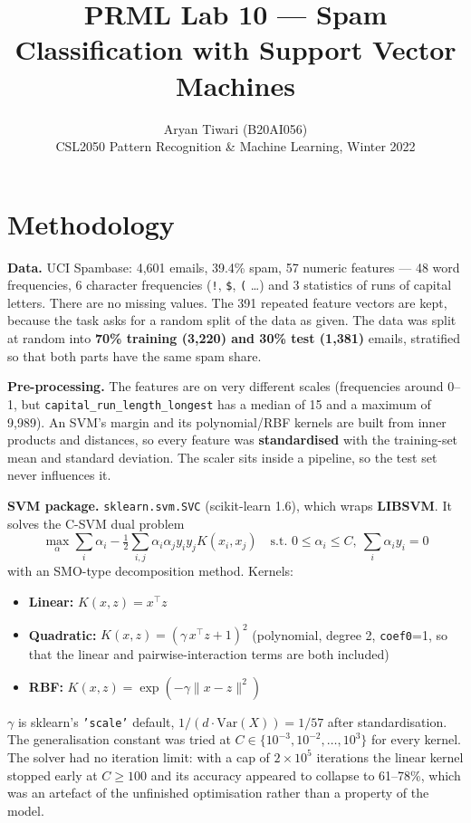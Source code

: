 \documentclass[11pt]{article}
\title{\textbf{PRML Lab 10 --- Spam Classification with Support Vector Machines}}
\author{Aryan Tiwari (B20AI056)\\CSL2050 Pattern Recognition \& Machine Learning, Winter 2022}
\date{}
\begin{document}
\maketitle

\section{Methodology}

\textbf{Data.} UCI Spambase: 4{,}601 emails, 39.4\% spam, 57 numeric features --- 48 word frequencies, 6 character frequencies
(\texttt{!}, \texttt{\$}, \texttt{(} \dots) and 3 statistics of runs of capital letters. There are no missing values. The 391 repeated feature
vectors are kept, because the task asks for a random split of the data as given. The data was split at random into \textbf{70\% training
(3{,}220) and 30\% test (1{,}381)} emails, stratified so that both parts have the same spam share.

\textbf{Pre-processing.} The features are on very different scales (frequencies around 0--1, but \texttt{capital\_run\_length\_longest} has a
median of 15 and a maximum of 9{,}989). An SVM's margin and its polynomial/RBF kernels are built from inner products and distances, so every feature was
\textbf{standardised} with the training-set mean and standard deviation. The scaler sits inside a pipeline, so the test set never influences it.

\textbf{SVM package.} \texttt{sklearn.svm.SVC} (scikit-learn 1.6), which wraps \textbf{LIBSVM}. It solves the C-SVM dual problem
\[
\max_\alpha \sum_i\alpha_i - \tfrac12\sum_{i,j}\alpha_i\alpha_j y_i y_j K(x_i,x_j)\quad\text{s.t. } 0\le\alpha_i\le C,\ \textstyle\sum_i\alpha_i y_i=0
\]
with an SMO-type decomposition method. Kernels:
\begin{itemize}\itemsep0pt
\item \textbf{Linear:} $K(x,z)=x^\top z$
\item \textbf{Quadratic:} $K(x,z)=(\gamma\,x^\top z+1)^2$ (polynomial, degree 2, \texttt{coef0}=1, so that the linear and pairwise-interaction terms are both included)
\item \textbf{RBF:} $K(x,z)=\exp(-\gamma\lVert x-z\rVert^2)$
\end{itemize}
$\gamma$ is sklearn's \texttt{'scale'} default, $1/(d\cdot\mathrm{Var}(X)) = 1/57$ after standardisation. The generalisation constant
was tried at $C\in\{10^{-3},10^{-2},\dots,10^{3}\}$ for every kernel. The solver had no iteration limit: with a cap of $2\times10^5$
iterations the linear kernel stopped early at $C\ge100$ and its accuracy appeared to collapse to 61--78\%, which was an artefact of
the unfinished optimisation rather than a property of the model.
\end{document}
